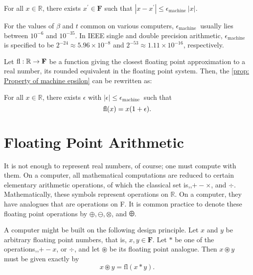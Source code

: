\begin{proposition}
\label{prop: Property of machine epsilon}
For all $x \in \mathbb{R}$, there exists $x^{\prime} \in \mathbf{F}$ such that $\left|x-x^{\prime}\right| \leq \epsilon_{\text {machine }}|x|$.
\end{proposition}

For the values of $\beta$ and $t$ common on various computers, $\epsilon_{\text {machine }}$ usually lies between $10^{-6}$ and $10^{-35}$. In IEEE single and double precision arithmetic, $\epsilon_{\text {machine }}$ is specified to be $2^{-24} \approx 5.96 \times 10^{-8}$ and $2^{-53} \approx 1.11 \times 10^{-16}$, respectively.

Let $\operatorname{fl} : \mathbb{R} \rightarrow \mathbf{F}$ be a function giving the closest floating point approximation to a real number, its rounded equivalent in the floating point system. Then, the \autoref{prop: Property of machine epsilon} can be rewritten as: 


\begin{proposition}
\label{prop: fl function}
For all $x \in \mathbb{R}$, there exists $\epsilon$ with $|\epsilon| \leq \epsilon_{\text {machine }}$ such that 
\begin{equation}
    \label{eq: fler}
    \operatorname{fl}(x)=x(1+\epsilon).     
\end{equation}

\end{proposition}


\section{Floating Point Arithmetic} 
It is not enough to represent real numbers, of course; one must compute with them. On a computer, all mathematical computations are reduced to certain elementary arithmetic operations, of which the classical set is,,$+- \times$, and $\div$. Mathematically, these symbols represent operations on $\mathbb{R}$. On a computer, they have analogues that are operations on F. It is common practice to denote these floating point operations by $\oplus, \ominus, \otimes$, and $\odiv$.

A computer might be built on the following design principle. Let $x$ and $y$ be arbitrary floating point numbers, that is, $x, y \in \mathbf{F}$. Let $*$ be one of the operations,,$+- x$, or $\div$, and let $\circledast$ be its floating point analogue. Then $x \circledast y$ must be given exactly by
$$
x \circledast y=\mathrm{fl}(x * y) .
$$


